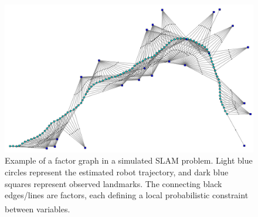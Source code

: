 \begin{figure}[H]
    \centering
    \includegraphics[width=0.9\linewidth]{Pictures/System_Modeling/Factor_Graphs/Example.png}
    \caption{Example of a factor graph in a simulated SLAM problem. Light blue circles represent the estimated robot trajectory, and dark blue squares represent observed landmarks. The connecting black edges/lines are factors, each defining a local probabilistic constraint between variables.\textsuperscript{\cite{factor_graphs}}}
    \label{fig:system-modeling-factor-graph-example}
\end{figure}